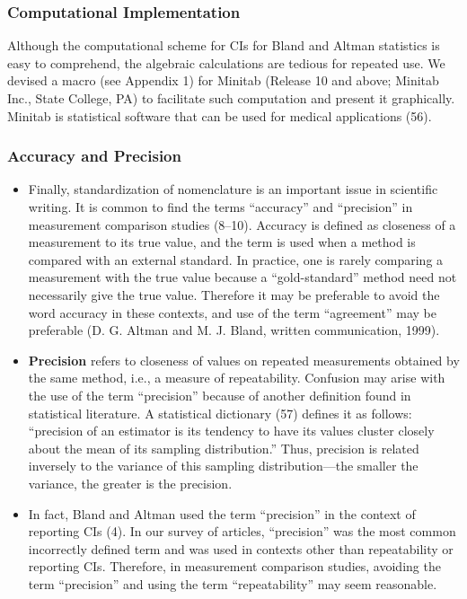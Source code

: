 \documentclass[MAIN.tex]{subfiles}
\begin{document}
	\subsubsection*{Computational Implementation}
	Although the computational scheme for CIs for Bland and Altman statistics is easy to comprehend, the algebraic calculations are tedious for repeated use. We devised a macro (see Appendix 1) for Minitab (Release 10 and above; Minitab Inc., State College, PA) to facilitate such computation and present it graphically. Minitab is statistical software that can be used for medical applications (56).
	\newpage
	\subsubsection*{Accuracy and Precision}
	\begin{itemize}
		\item Finally, standardization of nomenclature is an important issue in scientific writing. It is common to find the terms “accuracy” and “precision” in measurement comparison studies (8–10). Accuracy is defined as closeness of a measurement to its true value, and the term is used when a method is compared with an external standard. In practice, one is rarely comparing a measurement with the true value because a “gold-standard” method need not necessarily give the true value. Therefore it may be preferable to avoid the word accuracy in these contexts, and use of the term “agreement” may be preferable (D. G. Altman and M. J. Bland, written communication, 1999). 
		
		\item \textbf{Precision} refers to closeness of values on repeated measurements obtained by the same method, i.e., a measure of repeatability. Confusion may arise with the use of the term “precision” because of another definition found in statistical literature. A statistical dictionary (57) defines it as follows: “precision of an estimator is its tendency to have its values cluster closely about the mean of its sampling distribution.” Thus, precision is related inversely to the variance of this sampling distribution—the smaller the variance, the greater is the precision. 
		
		\item In fact, Bland and Altman used the term “precision” in the context of reporting CIs (4). In our survey of articles, “precision” was the most common incorrectly defined term and was used in contexts other than repeatability or reporting CIs. Therefore, in measurement comparison studies, avoiding the term “precision” and using the term “repeatability” may seem reasonable. 
		

\end{itemize}
\end{document}
